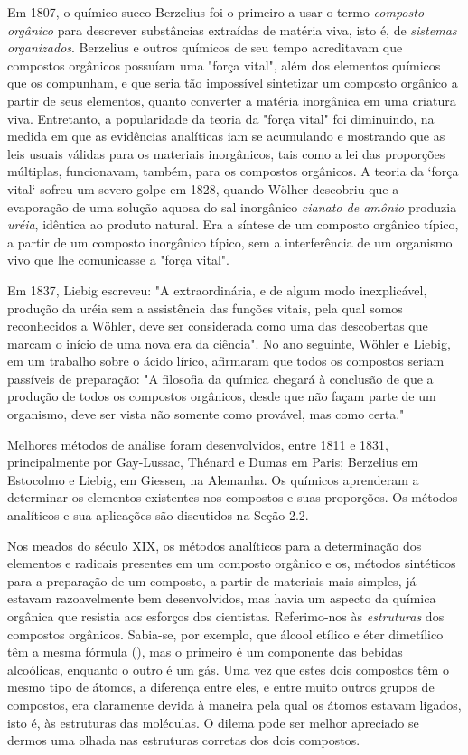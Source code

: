 Em 1807, o químico sueco Berzelius foi o primeiro a usar o termo \textit{composto orgânico} para descrever substâncias extraídas de matéria viva, isto é, de \textit{sistemas organizados}. Berzelius e outros químicos de seu tempo acreditavam que compostos orgânicos possuíam uma "força vital", além dos elementos químicos que os compunham, e que seria tão impossível sintetizar um composto orgânico a partir de seus elementos, quanto converter a matéria inorgânica em uma criatura viva. Entretanto, a popularidade da teoria da "força vital" foi diminuindo, na medida em que as evidências analíticas iam se acumulando e mostrando que as leis usuais válidas para os materiais inorgânicos, tais como a lei das proporções múltiplas, funcionavam, também, para os compostos orgânicos. A teoria da `força vital` sofreu um severo golpe em 1828, quando Wölher descobriu que a evaporação de uma solução aquosa do sal inorgânico \textit{cianato de amônio} produzia \textit{uréia}, idêntica ao produto natural. Era a síntese de um composto orgânico típico, a partir de um composto inorgânico típico, sem a interferência de um organismo vivo que lhe comunicasse a "força vital". 

Em 1837, Liebig escreveu: "A extraordinária, e de algum modo inexplicável, produção da uréia sem a assistência das funções vitais, pela qual somos reconhecidos a Wöhler, deve ser considerada como uma das descobertas que marcam o início de uma nova era da ciência". No ano seguinte, Wöhler e Liebig, em um trabalho sobre o ácido lírico, afirmaram que todos os compostos seriam passíveis de preparação: "A filosofia da química chegará à conclusão de que a produção de todos os compostos orgânicos, desde que não façam parte de um organismo, deve ser vista não somente como provável, mas como certa." 

Melhores métodos de análise foram desenvolvidos, entre 1811 e 1831, principalmente por Gay-Lussac, Thénard e Dumas em Paris; Berzelius em Estocolmo e Liebig, em Giessen, na Alemanha. Os químicos aprenderam a determinar os elementos existentes nos compostos e suas proporções. Os métodos analíticos e sua aplicações são discutidos na Seção 2.2. 

Nos meados do século XIX, os métodos analíticos para a determinação dos elementos e radicais presentes em um composto orgânico e os, métodos sintéticos para a preparação de um composto, a partir de materiais mais simples, já estavam razoavelmente bem desenvolvidos, mas havia um aspecto da química orgânica que resistia aos esforços dos cientistas. Referimo-nos às \textit{estruturas} dos compostos orgânicos. Sabia-se, por exemplo, que álcool etílico e éter dimetílico têm a mesma fórmula (), mas o primeiro é um componente das bebidas alcoólicas, enquanto o outro é um gás. Uma vez que estes dois compostos têm o mesmo tipo de átomos, a diferença entre eles, e entre muito outros grupos de compostos, era claramente devida à maneira pela qual os átomos estavam ligados, isto é, às estruturas das moléculas. O dilema pode ser melhor apreciado se dermos uma olhada nas estruturas corretas dos dois compostos. 


